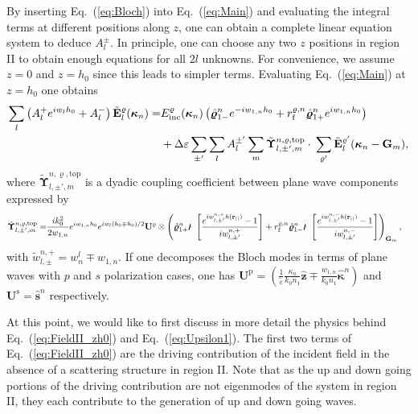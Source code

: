 \documentclass[ floatfix,reprint,amsmath,amssymb,aps,prb]{revtex4-1}
\begin{document}
\begin{widetext}
By inserting Eq.~(\ref{eq:Bloch}) into Eq.~(\ref{eq:Main}) and evaluating the integral terms at different positions along $z$, one can obtain a complete linear equation system to deduce $A^\pm_{l}$. In principle, one can choose any two $z$ positions in region II to obtain enough equations for all $2l$ unknowns. For convenience, we assume $z=0$ and $z=h_0$ since this leads to simpler terms. Evaluating Eq.~(\ref{eq:Main}) at $z=h_0$ one obtains 
\begin{align}
\sum_{l}\left(  A^+_{l}  e^{iw_{l}h_0}  +  A^-_{l} \right) \tilde{\mathbf{E}}^{\varrho}_{l}(\boldsymbol{\kappa}_n) = & E_{\mathrm{inc}}^{\varrho}(\boldsymbol{\kappa}_{n})\left( \hat{\boldsymbol{\varrho}}_{1-}^{n} e^{-iw_{1,n}h_0} + r_{\textnormal{f}}^{\varrho,n} \hat{\boldsymbol{\varrho}}_{1+}^{n} e^{iw_{1,n}h_0} \right) \nonumber \\ 
& +  \Delta\varepsilon  \sum_{\pm'} \sum_{l} A^{\pm'}_{l} \sum_{m} \tilde{\boldsymbol{\Upsilon}}^{n,\varrho,\mathrm{top}}_{l,\pm',m} \cdot\: \sum_{\varrho'}   \tilde{\mathbf{E}}^{\varrho'}_{l}(\boldsymbol{\kappa}_n-\mathbf{G}_{m}) ,\label{eq:FieldII_zh0}
\end{align}
where $\tilde{\boldsymbol{\Upsilon}}^{ n,\varrho,\mathrm{top}}_{l,\pm',m} $ is a dyadic coupling coefficient between plane wave components expressed by
\begin{align}
\tilde{ \boldsymbol{\Upsilon}}^{n,\varrho,\mathrm{top}}_{l,\pm',m} = &  \frac{ik_{0}^2}{2w_{1,n}} e^{iw_{1,n}h_0}  e^{iw_{l}(h_0\mp h_0)/2} \mathbf{U}^\varrho\otimes\left(\hat{\boldsymbol{\varrho}}_{1+}^{n} \digamma\left[  \frac{ e^{iw^{n,+}_{l,\pm'} h( \mathbf{r_{||} } ) }-1}{iw^{n,+}_{l,\pm'}}\right] +r_{\textnormal{f}}^{\varrho,n} \hat{\boldsymbol{\varrho}}_{1-}^{n} \digamma\left[  \frac{ e^{iw^{n,-}_{l,\pm'} h( \mathbf{r_{||} } ) }-1}{iw^{n,-}_{l,\pm'}}\right] \right)_{\mathbf{G}_m}, 
 \label{eq:Upsilon1}
\end{align}
with $\tilde{w}_{l,\pm}^{n,+}= w^{l}_{n} \mp w_{1,n} $. If one decomposes the Bloch modes in terms of plane waves with $p$ and $s$ polarization cases, one has $\mathbf{U}^\mathrm{p} = \left( \frac{1}{\widetilde{\varepsilon}} \frac{\kappa_{n}}{k_{0}n_{1}}  \hat{\boldsymbol{z}} \mp \frac{w_{1,n}}{k_{0}n_{1}} \hat{\boldsymbol{\kappa}}^n \right)$ and $\mathbf{U}^\mathrm{s} = \mathbf{\hat{s}}^n $ respectively.  

At this point, we would like to first discuss in more detail the physics behind Eq.~(\ref{eq:FieldII_zh0}) and Eq.~(\ref{eq:Upsilon1}). The first two terms of Eq.~(\ref{eq:FieldII_zh0}) are the driving contribution of the incident field in the absence of a scattering structure in region II. Note that as the up and down going portions of the driving contribution are not eigenmodes of the system in region II, they each contribute to the generation of up and down going waves. 


\end{widetext}
\end{document}
